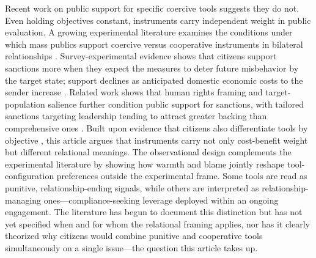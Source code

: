 \documentclass[12pt,letterpaper]{article}
\begin{document}
Recent work on public support for specific coercive tools suggests they do not. Even holding objectives constant, instruments carry independent weight in public evaluation. A growing experimental literature examines the conditions under which mass publics support coercive versus cooperative instruments in bilateral relationships \citep{tomz_domestic_2007, tomz_public_2013, heinrich_sanction_2017, frye_economic_2019}. Survey-experimental evidence shows that citizens support sanctions more when they expect the measures to deter future misbehavior by the target state; support declines as anticipated domestic economic costs to the sender increase \citep{heinrich_sanction_2017}. Related work shows that human rights framing and target-population salience further condition public support for sanctions, with tailored sanctions targeting leadership tending to attract greater backing than comprehensive ones \citep{mclean_public_2017, ari_human_2025}. Built upon evidence that citizens also differentiate tools by objective \citep{levin_what_2025}, this article argues that instruments carry not only cost-benefit weight but different relational meanings. The observational design complements the experimental literature by showing how warmth and blame jointly reshape tool-configuration preferences outside the experimental frame. Some tools are read as punitive, relationship-ending signals, while others are interpreted as relationship-managing ones---compliance-seeking leverage deployed within an ongoing engagement. The literature has begun to document this distinction but has not yet specified when and for whom the relational framing applies, nor has it clearly theorized why citizens would combine punitive and cooperative tools simultaneously on a single issue—the question this article takes up.
\end{document}
